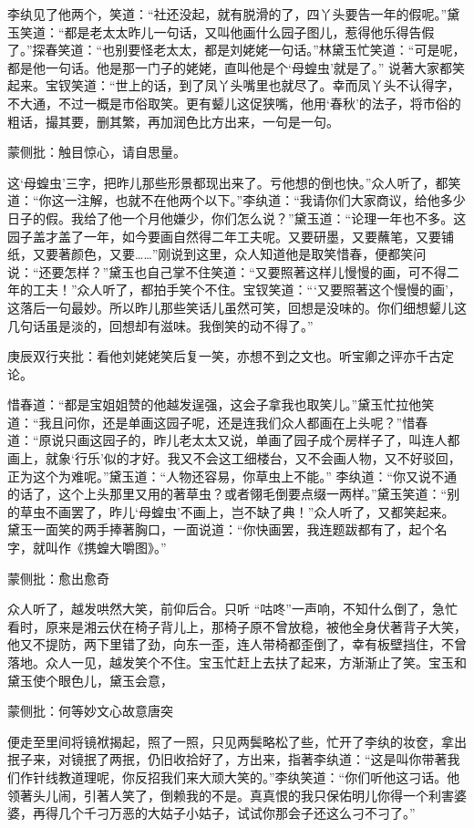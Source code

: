 \begin{parag}


    李纨见了他两个，笑道：“社还没起，就有脱滑的了，四丫头要告一年的假呢。”黛玉笑道：“都是老太太昨儿一句话，又叫他画什么园子图儿，惹得他乐得告假了。”探春笑道：“也别要怪老太太，都是刘姥姥一句话。”林黛玉忙笑道：“可是呢，都是他一句话。他是那一门子的姥姥，直叫他是个‘母蝗虫’就是了。” 说著大家都笑起来。宝钗笑道：“世上的话，到了凤丫头嘴里也就尽了。幸而凤丫头不认得字，不大通，不过一概是市俗取笑。更有颦儿这促狭嘴，他用‘春秋’的法子，将市俗的粗话，撮其要，删其繁，再加润色比方出来，一句是一句。\begin{note}蒙侧批：触目惊心，请自思量。\end{note}这‘母蝗虫’三字，把昨儿那些形景都现出来了。亏他想的倒也快。”众人听了，都笑道：“你这一注解，也就不在他两个以下。”李纨道：“我请你们大家商议，给他多少日子的假。我给了他一个月他嫌少，你们怎么说？”黛玉道：“论理一年也不多。这园子盖才盖了一年，如今要画自然得二年工夫呢。又要研墨，又要蘸笔，又要铺纸，又要著颜色，又要……”刚说到这里，众人知道他是取笑惜春，便都笑问说：“还要怎样？”黛玉也自己掌不住笑道：“又要照著这样儿慢慢的画，可不得二年的工夫！”众人听了，都拍手笑个不住。宝钗笑道：“‘又要照著这个慢慢的画’，这落后一句最妙。所以昨儿那些笑话儿虽然可笑，回想是没味的。你们细想颦儿这几句话虽是淡的，回想却有滋味。我倒笑的动不得了。”\begin{note}庚辰双行夹批：看他刘姥姥笑后复一笑，亦想不到之文也。听宝卿之评亦千古定论。\end{note}惜春道：“都是宝姐姐赞的他越发逞强，这会子拿我也取笑儿。”黛玉忙拉他笑道：“我且问你，还是单画这园子呢，还是连我们众人都画在上头呢？”惜春道：“原说只画这园子的，昨儿老太太又说，单画了园子成个房样子了，叫连人都画上，就象‘行乐’似的才好。我又不会这工细楼台，又不会画人物，又不好驳回，正为这个为难呢。”黛玉道：“人物还容易，你草虫上不能。” 李纨道：“你又说不通的话了，这个上头那里又用的著草虫？或者翎毛倒要点缀一两样。”黛玉笑道：“别的草虫不画罢了，昨儿‘母蝗虫’不画上，岂不缺了典！”众人听了，又都笑起来。黛玉一面笑的两手捧著胸口，一面说道：“你快画罢，我连题跋都有了，起个名字，就叫作《携蝗大嚼图》。”\begin{note}蒙侧批：愈出愈奇\end{note}众人听了，越发哄然大笑，前仰后合。只听 “咕咚”一声响，不知什么倒了，急忙看时，原来是湘云伏在椅子背儿上，那椅子原不曾放稳，被他全身伏著背子大笑，他又不提防，两下里错了劲，向东一歪，连人带椅都歪倒了，幸有板壁挡住，不曾落地。众人一见，越发笑个不住。宝玉忙赶上去扶了起来，方渐渐止了笑。宝玉和黛玉使个眼色儿，黛玉会意，\begin{note}蒙侧批：何等妙文心故意唐突\end{note}便走至里间将镜袱揭起，照了一照，只见两鬓略松了些，忙开了李纨的妆奁，拿出抿子来，对镜抿了两抿，仍旧收拾好了，方出来，指著李纨道：“这是叫你带著我们作针线教道理呢，你反招我们来大顽大笑的。”李纨笑道：“你们听他这刁话。他领著头儿闹，引著人笑了，倒赖我的不是。真真恨的我只保佑明儿你得一个利害婆婆，再得几个千刁万恶的大姑子小姑子，试试你那会子还这么刁不刁了。”
\end{parag}


